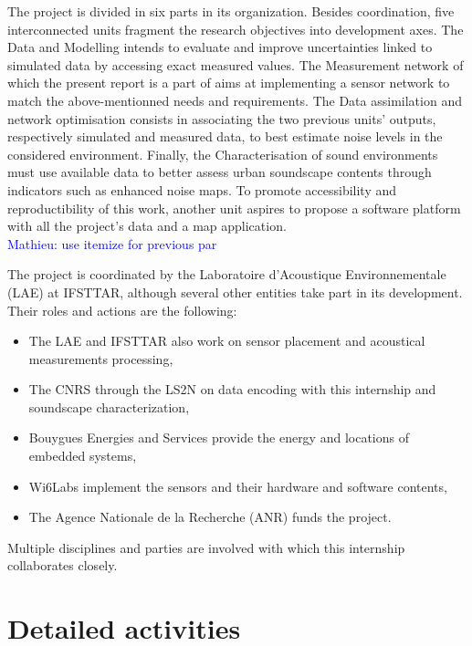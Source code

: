 \documentclass[12pt,times,onecolumn]{article}
\newcommand{\ml}[1]{\textcolor{blue}{ Mathieu: #1}}
\begin{document}
The project is divided in six parts in its organization. Besides coordination, five interconnected units fragment the research objectives into development axes. The Data and Modelling intends to evaluate and improve uncertainties linked to simulated data by accessing exact measured values. The Measurement network of which the present report is a part of aims at implementing a sensor network to match the above-mentionned needs and requirements. The Data assimilation and network optimisation consists in associating the two previous units' outputs, respectively simulated and measured data, to best estimate noise levels in the considered environment. Finally, the Characterisation of sound environments must use available data to better assess urban soundscape contents through indicators such as enhanced noise maps. To promote accessibility and reproductibility of this work, another unit aspires to propose a software platform with all the project's data and a map application.\\

\ml{use itemize for previous par}

The project is coordinated by the Laboratoire d'Acoustique Environnementale (LAE) at IFSTTAR, although several other entities take part in its development. Their roles and actions are the following:
\begin{itemize}
\item The LAE and IFSTTAR also work on sensor placement and acoustical measurements processing,
\item The CNRS through the LS2N on data encoding with this internship and soundscape characterization,
\item Bouygues Energies and Services provide the energy and locations of embedded systems,
\item Wi6Labs implement the sensors and their hardware and software contents,
\item The Agence Nationale de la Recherche (ANR) funds the project.
\end{itemize}
Multiple disciplines and parties are involved with which this internship collaborates closely.





\clearpage

\part{Detailed activities}
\setcounter{section}{0}
\end{document}

